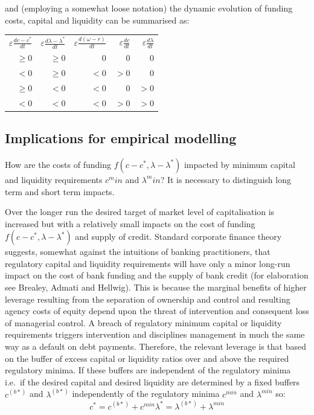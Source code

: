 \documentclass[
]{article}
\begin{document}
and (employing a somewhat loose notation) the dynamic evolution of funding costs, capital and liquidity can be summarised as:

\begin{center}
\begin{tabular}{ r r r r r}
$\varepsilon\frac{{d}c-c^\ast}{{d}t}$&
$\varepsilon\frac{{d}\lambda-\lambda^\ast}{{d}t}$&
$\varepsilon\frac{{d}(\omega- r)}{{d}t}$&
$\varepsilon\frac{{d}c}{{d}t}$&
$\varepsilon\frac{{d}\lambda}{{d}t} $\\
$\geq 0$&$\geq 0$&$0$&$0$&$0$\\
$<0$&$\geq 0$&$<0$&$>0$&$0$\\
$\geq 0$&$<0$&$<0$&$0$&$>0$\\
$<0$&$<0$&$<0$&$>0$&$>0$
\end{tabular}
\end{center}

\hypertarget{implications-for-empirical-modelling}{%
\subsection{Implications for empirical modelling}\label{implications-for-empirical-modelling}}

How are the costs of funding \(f(c-c^\ast,\lambda-\lambda^\ast)\) impacted by minimum capital and liquidity requirements \(c^min\) and \(\lambda^min\)? It is necessary to distinguish long term and short term impacts.

Over the longer run the desired target of market level of capitalisation is increased but with a relatively small impacts on the cost of funding \(f(c-c^\ast,\lambda-\lambda^\ast)\) and supply of credit. Standard corporate finance theory suggests, somewhat against the intuitions of banking practitioners, that regulatory capital and liquidity requirements will have only a minor long-run impact on the cost of bank funding and the supply of bank credit (for elaboration see Brealey, Admati and Hellwig). This is because the marginal benefits of higher leverage resulting from the separation of ownership and control and resulting agency costs of equity depend upon the threat of intervention and consequent loss of managerial control. A breach of regulatory minimum capital or liquidity requirements triggers intervention and disciplines management in much the same way as a default on debt payments. Therefore, the relevant leverage is that based on the buffer of excess capital or liquidity ratios over and above the required regulatory minima.
If these buffers are independent of the regulatory minima i.e.~if the desired capital and desired liquidity are determined by a fixed buffers \(c^(b\ast)\) and \(\lambda^(b\ast)\) independently of the regulatory minima \(c^{min}\) and \(\lambda^{min}\) so:
\[
c^\ast=c^(b*)+c^{min} 
\lambda^\ast=\lambda^(b*)+\lambda^{min} 
\]
\end{document}
